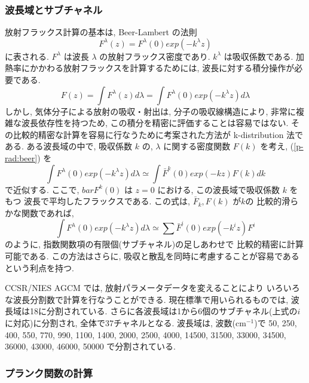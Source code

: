 \subsubsection{波長域とサブチャネル}

放射フラックス計算の基本は,
Beer-Lambert の法則
\begin{equation}
  F^\lambda(z) = F^\lambda(0) exp (-k^\lambda z)
\end{equation}
に表される. $F^\lambda$ は波長 $\lambda$ の放射フラックス密度であり.
$k^\lambda$ は吸収係数である.
加熱率にかかわる放射フラックスを計算するためには,
波長に対する積分操作が必要である.
%
\begin{equation}
  F(z) = \int F^\lambda(z) d \lambda 
 = \int F^\lambda(0) exp (-k^\lambda z) d \lambda
 \label{p-rad:beer}
\end{equation}
%
しかし, 気体分子による放射の吸収・射出は,
分子の吸収線構造により, 非常に複雑な波長依存性を持つため,
この積分を精密に評価することは容易ではない.
その比較的精密な計算を容易に行なうために考案された方法が
k-distribution 法である.
ある波長域の中で, 吸収係数 $k$ の,
$\lambda$ に関する密度関数 $F(k)$ を考え,
(\ref{p-rad:beer}) を
\begin{equation}
 \int F^\lambda(0) exp (-k^\lambda z) d \lambda 
 \simeq \int \bar{F}^k(0) exp (-k z) F(k) dk
\end{equation}
で近似する. ここで, $bar{F}^k(0)$ は
$z=0$ における, この波長域で吸収係数 $k$ をもつ
波長で平均したフラックスである.
この式は, $\bar{F}_k, F(k)$ が$k$の
比較的滑らかな関数であれば, 
\begin{equation}
 \int F^\lambda(0) exp (-k^\lambda z) d \lambda 
 \simeq \sum \bar{F}^i(0) exp (-k^i z) F^i
 \label{p-rad:beer-kd}
\end{equation}
のように, 指数関数項の有限個(サブチャネル)の足しあわせで
比較的精密に計算可能である.
この方法はさらに,
吸収と散乱を同時に考慮することが容易であるという利点を持つ.

CCSR/NIES AGCM では,
放射パラメータデータを変えることにより
いろいろな波長分割数で計算を行なうことができる.
現在標準で用いられるものでは,
波長域は18に分割されている.
さらに各波長域は1から6個のサブチャネル(上式の$i$に対応)に分割され,
全体で37チャネルとなる.
波長域は, 波数(cm$^{-1}$)で
50, 250, 400, 550, 770, 990, 1100, 1400, 2000,
2500, 4000, 14500, 31500, 33000, 34500, 36000, 43000, 46000, 50000
で分割されている.

\subsubsection{プランク関数の計算 }

